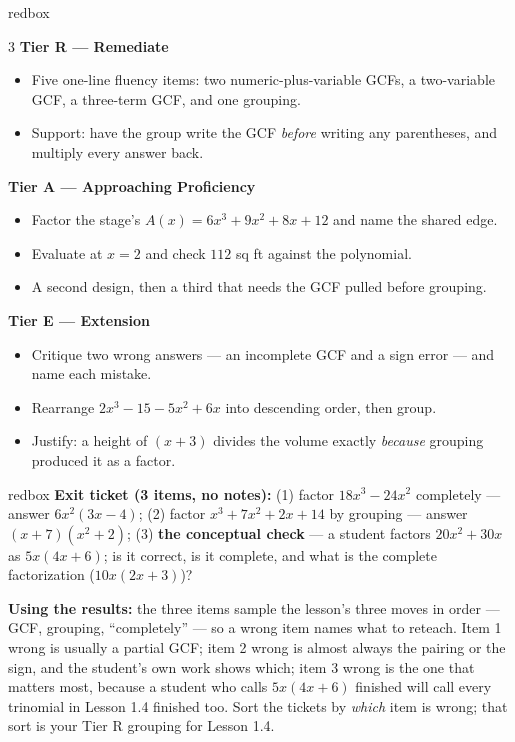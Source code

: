 \documentclass[10pt]{article}
\begin{document}
\boxguard
\begin{skillbox}{redbox}
\begin{multicols}{3}
\textbf{Tier R --- Remediate}
\begin{itemize}[leftmargin=1em, itemsep=1pt, topsep=2pt]
  \item Five one-line fluency items: two numeric-plus-variable GCFs, a two-variable GCF, a
        three-term GCF, and one grouping.
  \item Support: have the group write the GCF \emph{before} writing any parentheses, and multiply
        every answer back.
\end{itemize}

\columnbreak
\textbf{Tier A --- Approaching Proficiency}
\begin{itemize}[leftmargin=1em, itemsep=1pt, topsep=2pt]
  \item Factor the stage's $A(x)=6x^3+9x^2+8x+12$ and name the shared edge.
  \item Evaluate at $x=2$ and check $112$ sq ft against the polynomial.
  \item A second design, then a third that needs the GCF pulled before grouping.
\end{itemize}

\columnbreak
\textbf{Tier E --- Extension}
\begin{itemize}[leftmargin=1em, itemsep=1pt, topsep=2pt]
  \item Critique two wrong answers --- an incomplete GCF and a sign error --- and name each
        mistake.
  \item Rearrange $2x^3-15-5x^2+6x$ into descending order, then group.
  \item Justify: a height of $(x+3)$ divides the volume exactly \emph{because} grouping produced it
        as a factor.
\end{itemize}
\end{multicols}
\end{skillbox}

\begin{skillbox}{redbox}
\textbf{Exit ticket (3 items, no notes):} (1) factor $18x^3-24x^2$ completely --- answer
$6x^2(3x-4)$; (2) factor $x^3+7x^2+2x+14$ by grouping --- answer $(x+7)\left(x^2+2\right)$;
(3) \textbf{the conceptual check} --- a student factors $20x^2+30x$ as $5x(4x+6)$; is it correct, is
it complete, and what is the complete factorization ($10x(2x+3)$)?

\textbf{Using the results:} the three items sample the lesson's three moves in order --- GCF,
grouping, ``completely'' --- so a wrong item names what to reteach. Item 1 wrong is usually a
partial GCF; item 2 wrong is almost always the pairing or the sign, and the student's own work
shows which; item 3 wrong is the one that matters most, because a student who calls $5x(4x+6)$
finished will call every trinomial in Lesson 1.4 finished too. Sort the tickets by \emph{which}
item is wrong; that sort is your Tier R grouping for Lesson 1.4.
\end{skillbox}
\end{document}
